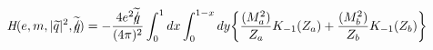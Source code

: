 \begin{equation}\textit{H}(e,m,|\widetilde{q}|^{2},\widetilde{q\hspace{-0.2cm}/})=
-\frac{4e^{2}\widetilde{q\hspace{-0.2cm}/}}{(4\pi)^{2}}\int_{0}^{1}dx\int_{0}^{1-x}dy
\biggl\{\frac{(M^{2}_{a})}{Z_{a}}K_{-1}(Z_{a})
+\frac{(M^{2}_{b})}{Z_{b}}K_{-1}(Z_{b})\biggr\}
 \end{equation}\
